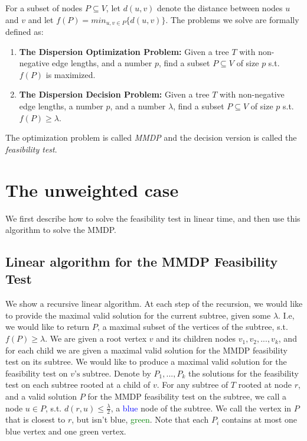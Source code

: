\documentclass[11pt,a4paper]{article}
\newtheorem{algo}{Algorithm}[section]
\theoremstyle{definition}
\newtheorem{definition}{Definition}
\theoremstyle{remark}
\begin{document}
For a subset of nodes $P\subseteq V$, let $d(u,v)$ denote the distance between nodes $u$ and $v$ and let $f(P)=min_{u,v\in P} \{d(u,v)\}$. The problems we solve are formally defined as: 

\begin{enumerate}
\item {\bf The Dispersion Optimization Problem:} Given a tree $T$ with non-negative edge lengths, and a  number $p$, find a subset $P\subseteq V$ of size $p$ s.t.  $f(P)$ is maximized. 

\item {\bf The Dispersion Decision Problem:}  Given a tree $T$ with non-negative edge lengths, a number $p$, and a number $\lambda$, find a subset $P\subseteq V$ of size $p$ s.t. $f(P)\geq\lambda$.
\end{enumerate}

\noindent The optimization problem is called {\em MMDP} and the decision version is called the {\em feasibility test}.
%
%
\section{The unweighted case}
We first describe how to solve the feasibility test in linear time, and then use this algorithm to solve the MMDP.
\subsection{Linear algorithm for the MMDP Feasibility Test}\label{linear F.T.}
We show a recursive linear algorithm.
At each step of the recursion, we would like to provide the maximal valid solution for the current subtree, given some $\lambda$. I.e, we would like to return $P$, a maximal subset of the vertices of the subtree, s.t. $f(P)\geq\lambda$.
We are given a root vertex $v$ and its children nodes $v_{1},v_{2},...,v_{k}$, and for each child we are given a maximal valid solution for the MMDP feasibility test on its subtree. We would like to produce a maximal valid solution for the feasibility test on $v\text{'s subtree}$.
Denote by $P_{1},...,P_{k}$ the solutions for the feasibility test on each subtree rooted at a child of $v$.
For any subtree of $T$ rooted at node $r$, and a valid solution $P$ for the MMDP feasibility test on the subtree, we call a node $u\in P$, s.t. $d(r,u)\leq\frac{\lambda}{2}$, a \textcolor{blue}{blue} node of the subtree. We call the vertex in $P$ that is closest to $r$, but isn't blue, \textcolor{green}{green}.
Note that each $P_{i}$ contains at most one blue vertex and one green vertex.
\end{document}
